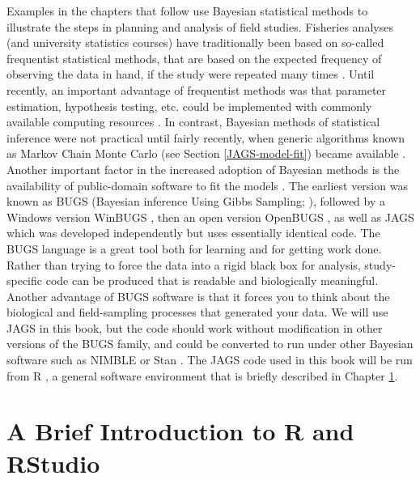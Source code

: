 \documentclass[
]{krantz}
\begin{document}
Examples in the chapters that follow use Bayesian statistical methods to illustrate the steps in planning and analysis of field studies. Fisheries analyses (and university statistics courses) have traditionally been based on so-called frequentist statistical methods, that are based on the expected frequency of observing the data in hand, if the study were repeated many times \citep{mccarthy2007}. Until recently, an important advantage of frequentist methods was that parameter estimation, hypothesis testing, etc. could be implemented with commonly available computing resources \citep{dorazio_2016}. In contrast, Bayesian methods of statistical inference were not practical until fairly recently, when generic algorithms known as Markov Chain Monte Carlo (see Section \ref{JAGS-model-fit}) became available \citep{dorazio_2016}. Another important factor in the increased adoption of Bayesian methods is the availability of public-domain software to fit the models \citep{kéry.schaub_2011}. The earliest version was known as BUGS (Bayesian inference Using Gibbs Sampling; \citet{lunn.etal2009}), followed by a Windows version WinBUGS \citep{lunn.etal2000}, then an open version OpenBUGS \citep{lunn.etal2009}, as well as JAGS \citep{plummer2003} which was developed independently but uses essentially identical code. The BUGS language is a great tool both for learning and for getting work done. Rather than trying to force the data into a rigid black box for analysis, study-specific code can be produced that is readable and biologically meaningful. Another advantage of BUGS software is that it forces you to think about the biological and field-sampling processes that generated your data. We will use JAGS in this book, but the code should work without modification in other versions of the BUGS family, and could be converted to run under other Bayesian software such as NIMBLE \citep{devalpine.etal_2017} or Stan \citep{gelman.etal_2015}. The JAGS code used in this book will be run from R \citep{R-base}, a general software environment that is briefly described in Chapter \ref{R-intro}.

\hypertarget{R-intro}{%
\chapter{A Brief Introduction to R and RStudio}\label{R-intro}}
\end{document}
